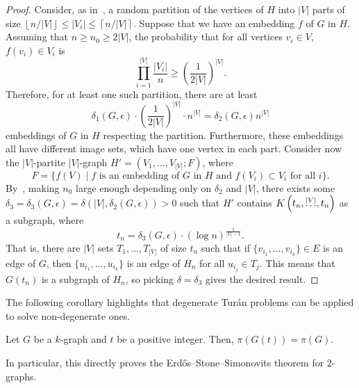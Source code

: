 \begin{theorem}
\begin{proof}
        Consider, as in~,
        a random partition of the vertices of $H$ into $|V|$ parts of size
        $\left\lfloor n / |V| \right\rfloor  \leq |V_i| \leq \left\lceil n / |V|  \right\rceil$.
        Suppose that we have an embedding $f$ of $G$ in $H$.
        Assuming that $n \geq n_0 \geq 2|V|$,
        the probability that for all vertices $v_i \in V$, $f(v_i) \in V_i$ is
        \[
            \prod_{i=1}^{|V|} \frac{|V_i|}{n} \geq \left( \frac{1}{2|V|} \right)^{|V|}.
        \]
        Therefore, for at least one such partition, there are at least
        \[
            \delta_1(G, \epsilon) \cdot \left( \frac{1}{2|V|} \right)^{|V|} \cdot n^{|V|} = \delta_2(G, \epsilon) n^{|V|}
        \]
        embeddings of $G$ in $H$ respecting the partition.
        Furthermore, these embeddings all have different image sets, which have one vertex in each part.
        Consider now the $|V|$-partite $|V|$-graph $H' = (V_1, \dots, V_{|V|}; F)$,
        where
        \[
            F = \{f(V) \mid f \text{ is an embedding of } G \text{ in } H \text{ and } f(V_i) \subset V_i \text{ for all } i\}.
        \]
        By~, making $n_0$ large enough depending only on $\delta_2$ and $|V|$,
        there exists some $\delta_3 = \delta_3(G, \epsilon) = \delta(|V|, \delta_2(G, \epsilon)) > 0$ such that
        $H'$ contains $K\left(t_n, \overset{|V|}{\dots}, t_n\right)$ as a subgraph, where
        \[
            t_n = \delta_3(G, \epsilon) \cdot (\log n)^{\frac{1}{|V|-1}}.
        \]
        That is, there are $|V|$ sets $T_1, \dots, T_{|V|}$ of size $t_n$ such that
        if $\{v_{i_1}, \dots, v_{i_k}\} \in E$ is an edge of $G$, then
        $\{u_{i_1}, \dots, u_{i_k}\}$ is an edge of $H_n$ for all $u_{i_j} \in T_j$.
        This means that $G(t_n)$ is a subgraph of $H_n$, so picking $\delta = \delta_3$
        gives the desired result.

    \end{proof}
\end{theorem}

The following corollary highlights that degenerate Turán problems can be applied to solve non-degenerate ones.
\begin{corollary}
    Let $G$ be a $k$-graph and $t$ be a positive integer.
    Then, $\pi(G(t)) = \pi(G)$.
\end{corollary}

In particular, this directly proves the Erdős--Stone--Simonovits theorem for $2$-graphs.

